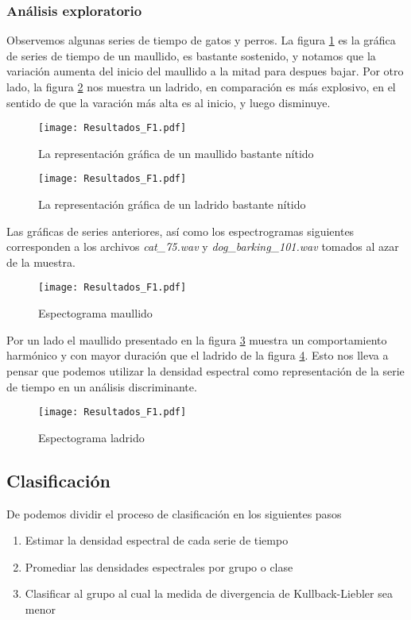 \documentclass[twocolumn,10pt]{asme2ej}
\begin{document}
\subsubsection*{An\'alisis exploratorio} %
\label{ssub:analisis_exploratorio}
Observemos algunas series de tiempo de gatos y perros. La figura \ref{plot:ts_maullido1} es la gr\'afica de series de tiempo de un maullido, es bastante sostenido, y notamos que la variaci\'on aumenta del inicio del maullido a la mitad para despues bajar. Por otro lado, la figura \ref{plot:ts_ladrido1} nos muestra un ladrido, en comparaci\'on es m\'as explosivo, en el sentido de que la varaci\'on m\'as alta es al inicio, y luego disminuye.
\begin{figure}[h]
  \centering
    \texttt{[image: Resultados\_F1.pdf]}
  \caption{La representaci\'on gr\'afica de un maullido bastante n\'itido}
  \label{plot:ts_maullido1}
\end{figure}
\begin{figure}[h]
  \centering
    \texttt{[image: Resultados\_F1.pdf]}
  \caption{La representaci\'on gr\'afica de un ladrido bastante n\'itido}
  \label{plot:ts_ladrido1}
\end{figure}
Las gr\'aficas de series anteriores, as\'i como los espectrogramas siguientes corresponden a los archivos \textit{cat\_75.wav} y \textit{dog\_barking\_101.wav} tomados al azar de la muestra.\\
\begin{figure}[h]
  \centering
    \texttt{[image: Resultados\_F1.pdf]}
  \caption{Espectograma maullido}
  \label{plot:spec_maullido1}
\end{figure}
Por un lado el maullido presentado en la figura \ref{plot:spec_maullido1} muestra un comportamiento harm\'onico y con mayor duraci\'on que el ladrido de la figura \ref{plot:spec_ladrido1}. Esto nos lleva a pensar que podemos utilizar la densidad espectral como representaci\'on de la serie de tiempo en un an\'alisis discriminante.
\begin{figure}[h]
  \centering
    \texttt{[image: Resultados\_F1.pdf]}
  \caption{Espectograma ladrido}
  \label{plot:spec_ladrido1}
\end{figure}
\subsection*{Clasificaci\'on} %
\label{sub:clasificacion}
De \cite{SUBJ_SP1} podemos dividir el proceso de clasificaci\'on en los siguientes pasos
\begin{enumerate}
  \item Estimar la densidad espectral de cada serie de tiempo
  \item Promediar las densidades espectrales por grupo o clase
  \item Clasificar al grupo al cual la medida de divergencia de Kullback-Liebler sea menor
\end{enumerate}
\end{document}
